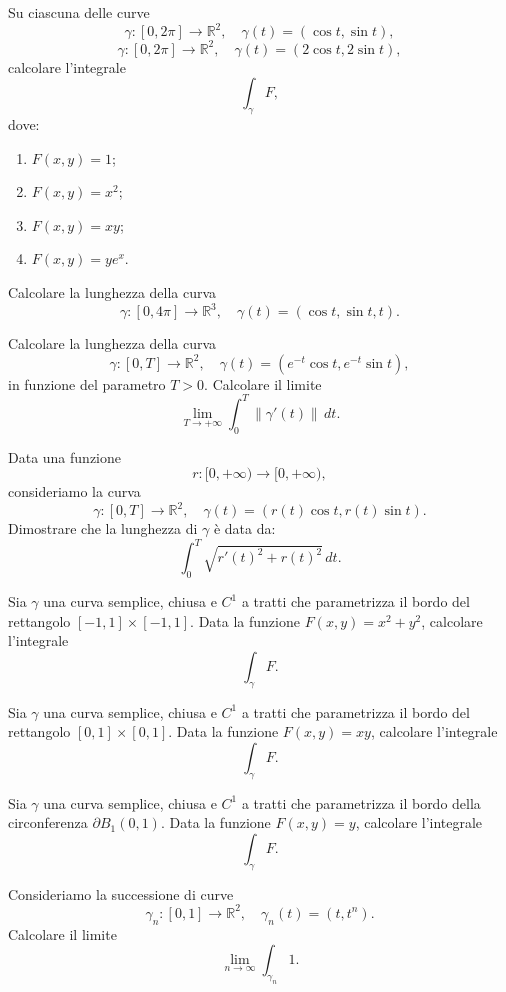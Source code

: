 \begin{exercise}
Su ciascuna delle curve
\[
\gamma : [0, 2\pi] \to \mathbb{R}^2, \quad \gamma(t) = (\cos t, \sin t),
\]
\[
\gamma : [0, 2\pi] \to \mathbb{R}^2, \quad \gamma(t) = (2\cos t, 2\sin t),
\]
calcolare l'integrale
\[
\int_\gamma F,
\]
dove:
\begin{enumerate}
	\item \( F(x, y) = 1 \);
	\item \( F(x, y) = x^2 \);
	\item \( F(x, y) = xy \);
	\item \( F(x, y) = y e^x \).
\end{enumerate}
\end{exercise}
\begin{exercise}
Calcolare la lunghezza della curva
\[
\gamma : [0, 4\pi] \to \mathbb{R}^3, \quad \gamma(t) = (\cos t, \sin t, t).
\]
\end{exercise}
\begin{exercise}
Calcolare la lunghezza della curva
\[
\gamma : [0, T] \to \mathbb{R}^2, \quad \gamma(t) = (e^{-t} \cos t, e^{-t} \sin t),
\]
in funzione del parametro \( T > 0 \). Calcolare il limite
\[
\lim_{T \to +\infty} \int_0^T \|\gamma'(t)\| \, dt.
\]
\end{exercise}
\begin{exercise}
Data una funzione
\[
r : [0, +\infty) \to [0, +\infty),
\]
consideriamo la curva
\[
\gamma : [0, T] \to \mathbb{R}^2, \quad \gamma(t) = (r(t) \cos t, r(t) \sin t).
\]
Dimostrare che la lunghezza di \( \gamma \) è data da:
\[
\int_0^T \sqrt{r'(t)^2 + r(t)^2} \, dt.
\]
\end{exercise}
\begin{exercise}
Sia \( \gamma \) una curva semplice, chiusa e \( C^1 \) a tratti che parametrizza il bordo del rettangolo \([-1, 1] \times [-1, 1]\). Data la funzione \( F(x, y) = x^2 + y^2 \), calcolare l'integrale
\[
\int_\gamma F.
\]
\end{exercise}
\begin{exercise}
Sia \( \gamma \) una curva semplice, chiusa e \( C^1 \) a tratti che parametrizza il bordo del rettangolo \([0, 1] \times [0, 1]\). Data la funzione \( F(x, y) = xy \), calcolare l'integrale
\[
\int_\gamma F.
\]
\end{exercise}
\begin{exercise}
Sia \( \gamma \) una curva semplice, chiusa e \( C^1 \) a tratti che parametrizza il bordo della circonferenza \( \partial B_1(0, 1) \). Data la funzione \( F(x, y) = y \), calcolare l'integrale
\[
\int_\gamma F.
\]
\end{exercise}
\begin{exercise}
Consideriamo la successione di curve
\[
\gamma_n : [0, 1] \to \mathbb{R}^2, \quad \gamma_n(t) = (t, t^n).
\]
Calcolare il limite
\[
\lim_{n \to \infty} \int_{\gamma_n} 1.
\]
\end{exercise}

